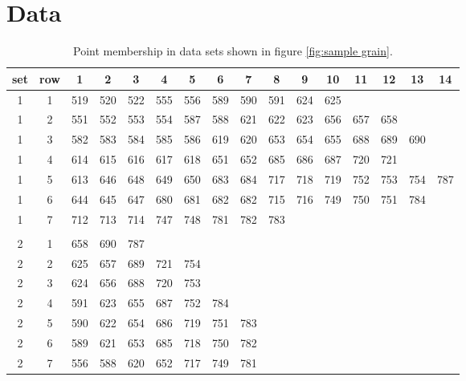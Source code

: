 \section{Data} %
{\tiny{
\begin{table}[htbp]
\caption{Point membership in data sets shown in figure \ref{fig:sample grain}.}
  \begin{center}
    \begin{tabular}{cccccccccccccccc}
      set & row & 1 & 2 & 3 & 4 & 5 & 6 & 7 & 8 & 9 & 10 & 11 & 12 & 13 & 14 \\\hline
      1 &  1 & 519 & 520 & 522 & 555 & 556 & 589 & 590 & 591 & 624 & 625 \\
      1 &  2 & 551 & 552 & 553 & 554 & 587 & 588 & 621 & 622 & 623 & 656 & 657 & 658 \\
      1 &  3 & 582 & 583 & 584 & 585 & 586 & 619 & 620 & 653 & 654 & 655 & 688 & 689 & 690 \\
      1 &  4 & 614 & 615 & 616 & 617 & 618 & 651 & 652 & 685 & 686 & 687 & 720 & 721 \\
      1 &  5 & 613 & 646 & 648 & 649 & 650 & 683 & 684 & 717 & 718 & 719 & 752 & 753 & 754 & 787 \\
      1 &  6 & 644 & 645 & 647 & 680 & 681 & 682 & 682 & 715 & 716 & 749 & 750 & 751 & 784 \\
      1 &  7 & 712 & 713 & 714 & 747 & 748 & 781 & 782 & 783 \\
      && \\
      2 &  1 & 658 & 690 & 787 \\
      2 &  2 & 625 & 657 & 689 & 721 & 754 \\
      2 &  3 & 624 & 656 & 688 & 720 & 753 \\
      2 &  4 & 591 & 623 & 655 & 687 & 752 & 784 \\
      2 &  5 & 590 & 622 & 654 & 686 & 719 & 751 & 783 \\
      2 &  6 & 589 & 621 & 653 & 685 & 718 & 750 & 782 \\
      2 &  7 & 556 & 588 & 620 & 652 & 717 & 749 & 781 \\

\end{tabular}
\end{center}
\end{table}}}
